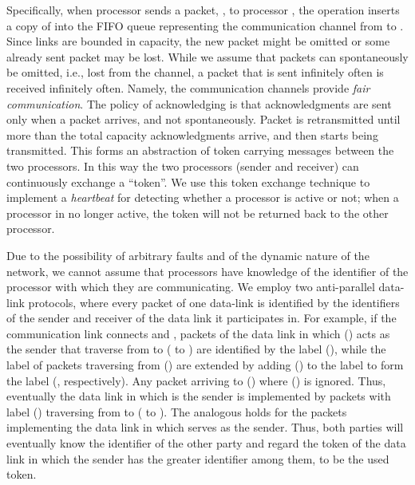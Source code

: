 \documentclass[11pt]{article}
\begin{document}
Specifically, when processor  sends a packet, , to processor , the operation  inserts a copy of  into the FIFO queue representing the communication channel from  to . 
Since links are bounded in capacity, the new packet might be omitted or some already sent packet may be lost. 
While we assume that packets can spontaneously be omitted, i.e., lost from the channel, a packet that is sent infinitely often is received infinitely often. Namely, the communication channels provide \textit{fair communication}.
The policy of acknowledging is that acknowledgments are sent only when a packet arrives, and not spontaneously. 
Packet  is retransmitted until more than the total capacity acknowledgments arrive, and then  starts being transmitted. 
This forms an abstraction of token carrying messages between the two processors.
In this way the two processors (sender and receiver) can continuously exchange a ``token''.
We use this token exchange technique to implement a {\em heartbeat} for detecting  whether a processor is active or not; when a processor in no longer active, the token will not be returned back to the other processor.


Due to the possibility of arbitrary faults and of the dynamic nature of the network, we cannot assume that processors have knowledge of the identifier of the processor with which they are communicating.
We employ two anti-parallel data-link protocols, where every packet of one data-link is identified by the identifiers of the sender and receiver of the data link it participates in. 
For example, if the communication link connects  and , packets of the data link in which  () acts as the sender that traverse from  to  ( to ) are identified by the label  (), while the label of packets traversing from  () are extended by adding  () to the label to form the label  (, respectively).  Any packet  arriving to  () where  () is ignored. Thus, eventually the data link in which  is the sender is implemented by packets with label  () traversing from  to  ( to ). The analogous holds for the packets implementing the data link in which  serves as the sender. Thus, both parties will eventually know the identifier of the other party and regard the token of the data link in which the sender has the greater identifier among them, to be the used token. 
\end{document}
